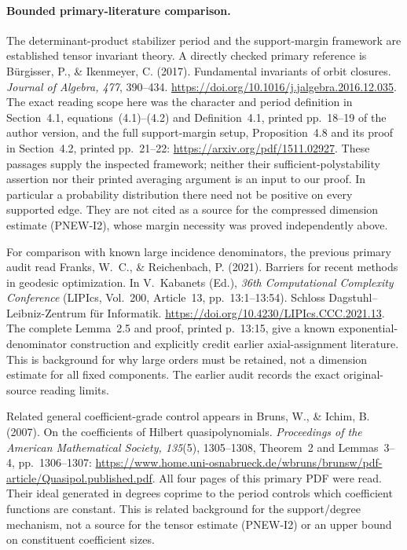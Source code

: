 \paragraph{Bounded primary-literature comparison.}
The determinant-product stabilizer period and the support-margin
framework are established tensor invariant theory. A directly checked
primary reference is B\"urgisser, P., \& Ikenmeyer, C. (2017).
Fundamental invariants of orbit closures.
\emph{Journal of Algebra, 477}, 390--434.
\url{https://doi.org/10.1016/j.jalgebra.2016.12.035}.
The exact reading scope here was the character and period definition
in Section~4.1, equations~(4.1)--(4.2) and Definition~4.1, printed
pp.~18--19 of the author version, and the full support-margin setup,
Proposition~4.8 and its proof in Section~4.2, printed pp.~21--22:
\url{https://arxiv.org/pdf/1511.02927}.
These passages supply the inspected framework; neither their
sufficient-polystability assertion nor their printed averaging
argument is an input to our proof. In particular a probability
distribution there need not be positive on every supported edge.
They are not cited as a source for the compressed dimension estimate
(PNEW-I2), whose margin necessity was proved independently above.

For comparison with known large incidence denominators, the previous
primary audit read Franks, W.~C., \& Reichenbach, P. (2021).
Barriers for recent methods in geodesic optimization. In V.~Kabanets
(Ed.), \emph{36th Computational Complexity Conference}
(LIPIcs, Vol.~200, Article~13, pp.~13:1--13:54).
Schloss Dagstuhl--Leibniz-Zentrum f\"ur Informatik.
\url{https://doi.org/10.4230/LIPIcs.CCC.2021.13}.
The complete Lemma~2.5 and proof, printed p.~13:15, give a known
exponential-denominator construction and explicitly credit earlier
axial-assignment literature. This is background for why large orders
must be retained, not a dimension estimate for all fixed components.
The earlier audit records the exact original-source reading limits.

Related general coefficient-grade control appears in Bruns, W., \&
Ichim, B. (2007). On the coefficients of Hilbert quasipolynomials.
\emph{Proceedings of the American Mathematical Society, 135}(5),
1305--1308, Theorem~2 and Lemmas~3--4, pp.~1306--1307:
\url{https://www.home.uni-osnabrueck.de/wbruns/brunsw/pdf-article/Quasipol.published.pdf}.
All four pages of this primary PDF were read. Their ideal generated
in degrees coprime to the period controls which coefficient functions
are constant. This is related background for the support/degree
mechanism, not a source for the tensor estimate (PNEW-I2) or an
upper bound on constituent coefficient sizes.

